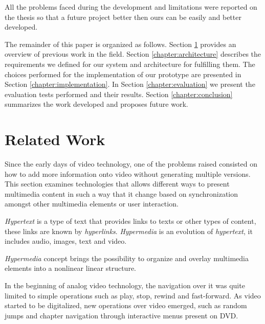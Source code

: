 \documentclass[10pt,conference]{IEEEtran}
\begin{document}
	All the problems faced during the development and limitations were reported on the thesis so that a future project better then ours can be easily and better developed.

The remainder of this paper is organized as follows.
Section \ref{chapter:relatedwork} provides an overview of previous work in the field.
Section \ref{chapter:architecture} describes the requirements we defined for our system and architecture for fulfilling them.
The choices performed for the implementation of our prototype are presented in Section \ref{chapter:implementation}.
In Section \ref{chapter:evaluation} we present the evaluation tests performed and their results.
Section \ref{chapter:conclusion} summarizes the work developed and proposes future work.









\section{Related Work}
\label{chapter:relatedwork}


Since the early days of video technology, one of the problems raised consisted on how to add more information onto video without generating multiple versions. This section examines technologies that allows different ways to present multimedia content in such a way that it change based on synchronization amongst other multimedia elements or user interaction.

\emph{Hypertext} is a type of text that provides links to texts or other types of content, these links are known by \emph{hyperlinks}. \emph{Hypermedia} is an evolution of \emph{hypertext}, it includes audio, images, text and video. 

\emph{Hypermedia} concept brings the possibility to organize and overlay multimedia elements into a nonlinear linear structure.

In the beginning of analog video technology, the navigation over it was quite limited to simple operations such as play, stop, rewind and fast-forward. As video started to be digitalized, new operations over video emerged, such as random jumps and chapter navigation through interactive menus present on \gls{DVD}.

\end{document}
